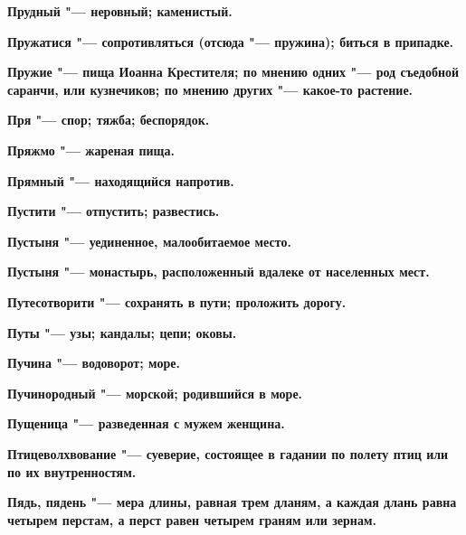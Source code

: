 \begin{mymulticols}{2}
\bfseries Прудный\normalfont{} "--- неровный; каменистый. 




\bfseries Пружатися\normalfont{} "--- сопротивляться (отсюда "--- пружина); биться в припадке. 




\bfseries Пружие\normalfont{} "--- пища Иоанна Крестителя; по мнению одних "--- род съедобной саранчи, или кузнечиков; по мнению других "--- какое-то растение. 




\bfseries Пря\normalfont{} "--- спор; тяжба; беспорядок. 




\bfseries Пряжмо\normalfont{} "--- жареная пища. 




\bfseries Прямный\normalfont{} "--- находящийся напротив. 




\bfseries Пустити\normalfont{} "--- отпустить; развестись. 




\bfseries Пустыня\normalfont{} "--- уединенное, малообитаемое место. 




\bfseries Пустыня\normalfont{} "--- монастырь, расположенный вдалеке от населенных мест. 




\bfseries Путесотворити\normalfont{} "--- сохранять в пути; проложить дорогу. 




\bfseries Путы\normalfont{} "--- узы; кандалы; цепи; оковы. 




\bfseries Пучина\normalfont{} "--- водоворот; море. 




\bfseries Пучинородный\normalfont{} "--- морской; родившийся в море. 




\bfseries Пущеница\normalfont{} "--- разведенная с мужем женщина. 




\bfseries Птицеволхвование\normalfont{} "--- суеверие, состоящее в гадании по полету птиц или по их внутренностям. 




\bfseries Пядь, пядень\normalfont{} "--- мера длины, равная трем дланям, а каждая длань равна четырем перстам, а перст равен четырем граням или зернам. 





\end{mymulticols}
